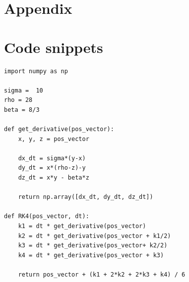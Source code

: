 \documentclass[11pt]{article}
\begin{document}
\clearpage

\appendix
\section*{Appendix}
\section{Code snippets}
\label{appendix:code}

\begin{lstlisting}[label=rk4:lorenz, caption={RK4 implementation}]
import numpy as np

sigma =  10
rho = 28
beta = 8/3

def get_derivative(pos_vector):
    x, y, z = pos_vector

    dx_dt = sigma*(y-x)
    dy_dt = x*(rho-z)-y
    dz_dt = x*y - beta*z

    return np.array([dx_dt, dy_dt, dz_dt])

def RK4(pos_vector, dt):
    k1 = dt * get_derivative(pos_vector)
    k2 = dt * get_derivative(pos_vector + k1/2)
    k3 = dt * get_derivative(pos_vector+ k2/2)
    k4 = dt * get_derivative(pos_vector + k3)

    return pos_vector + (k1 + 2*k2 + 2*k3 + k4) / 6

\end{lstlisting}
\end{document}
